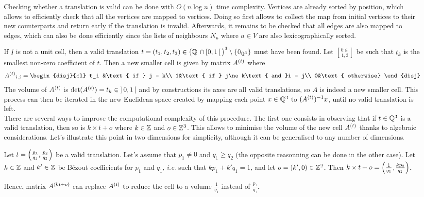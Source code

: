 \documentclass[main.tex]{subfiles}
\begin{document}
Checking whether a translation is valid can be done with $O(n\log n)$ time complexity. Vertices are already sorted by position, which allows to efficiently check that all the vertices are mapped to vertices. Doing so first allows to collect the map from initial vertices to their new counterparts and return early if the translation is invalid. Afterwards, it remains to be checked that all edges are also mapped to edges, which can also be done efficiently since the lists of neighbours $N_u$ where $u\in V$ are also lexicographically sorted.

If $I$ is not a unit cell, then a valid translation $t = (t_1,t_2,t_3)\in\big(\mathbb{Q}\,\cap\left[0,1\,\right[\big)^3\setminus\{0_{\mathbb{Q}^3}\}$ must have been found. Let $k\in\brack{1,3}$ be such that $t_k$ is the smallest non-zero coefficient of $t$. Then a new smaller cell is given by matrix $A^{\left(t\right)}$ where
\[{\der At}_{i,j} = \begin{disj}{cl}
	t_i &\text{ if } j = k\\
	1&\text{ if } j\ne k\text{ and }i = j\\
	0&\text{ otherwise}
\end{disj}\]
The volume of $A^{\left(t\right)}$ is $\det(A^{\left(t\right)}) = t_k\in\left]\,0,1\,\right[$ and by constructions its axes are all valid translations, so $A$ is indeed a new smaller cell. This process can then be iterated in the new Euclidean space created by mapping each point $x\in\mathbb{Q}^3$ to $(A^{\left(t\right)})^{-1}x$, until no valid translation is left.\\

There are several ways to improve the computational complexity of this procedure. The first one consists in observing that if $t\in\mathbb{Q}^3$ is a valid translation, then so is $k\times t + o$ where $k\in\mathbb{Z}$ and $o\in\mathbb{Z}^3$. This allows to minimise the volume of the new cell $A^{\left(t\right)}$ thanks to algebraic considerations. Let's illustrate this point in two dimensions for simplicity, although it can be generalised to any number of dimensions.

Let $t =\left(\frac{p_1}{q_1}, \frac{p_2}{q_2}\right)$ be a valid translation. Let's assume that $p_1\ne0$ and $q_1 \ge q_2$ (the opposite reasonning can be done in the other case). Let $k\in\mathbb{Z}$ and $k'\in\mathbb{Z}$ be B\'{e}zout coefficients for $p_1$ and $q_1$, \textit{i.e.} such that $kp_1 + k'q_1 = 1$, and let $o = (k', 0)\in\mathbb{Z}^2$. Then $k\times t + o = \left(\frac1{q_1}, \frac{kp_2}{q_2}\right)$.

Hence, matrix $A^{\left(kt+o\right)}$ can replace $A^{\left(t\right)}$ to reduce the cell to a volume $\frac1{q_1}$ instead of $\frac{p_1}{q_1}$.\\
\end{document}
